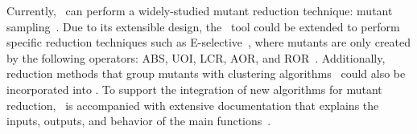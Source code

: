 





Currently, \mr~can perform a widely-studied mutant reduction technique: mutant sampling~\cite{gopinath2015mutation,
jia2011analysis, gopinath2015empirical}. Due to its extensible design, the \mr~tool could be extended to perform
specific reduction techniques such as E-selective~\cite{offutt1996experimental}, where mutants are only created by the
following operators: ABS, UOI, LCR, AOR, and ROR~\cite{gopinath2015empirical}. Additionally, reduction methods that group
mutants with clustering algorithms~\cite{jia2011analysis} could also be incorporated into \mr. To support the
integration of new algorithms for mutant reduction, \mr~is accompanied with extensive documentation that explains the
inputs, outputs, and behavior of the main functions~\cite{tool}.



